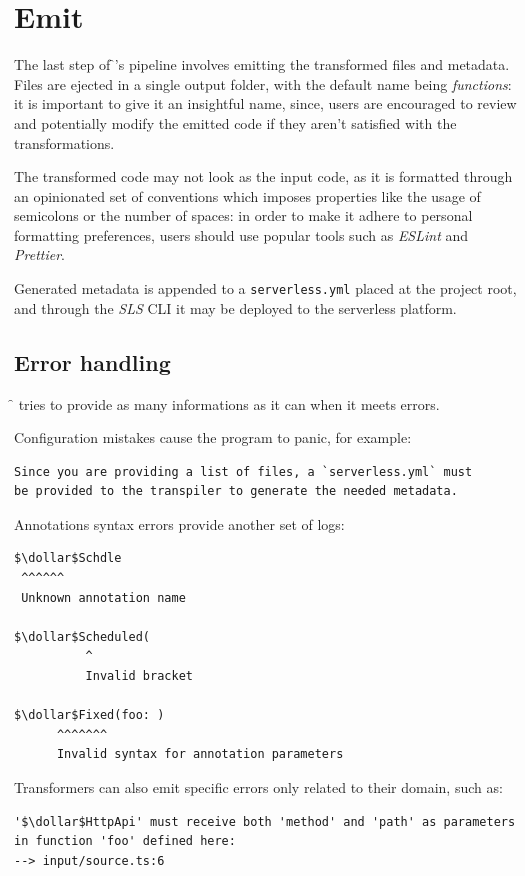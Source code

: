 \section{Emit}

The last step of \f{}'s pipeline involves emitting the transformed files and metadata.
Files are ejected in a single output folder,
with the default name being \textit{functions}: it is important to give it an insightful name,
since, users are encouraged to review and potentially modify the emitted code
if they aren't satisfied with the transformations.

The transformed code may not look as the input code, as it is formatted
through an opinionated set of conventions which imposes properties like
the usage of semicolons or the number of spaces:
in order to make it adhere to personal formatting preferences,
users should use popular tools such as \textit{ESLint} and \textit{Prettier}.

Generated metadata is appended to a \verb|serverless.yml| placed at the project root,
and through the \textit{SLS} CLI it may be deployed to the serverless platform.

\subsection{Error handling}

\f{} tries to provide as many informations as it can when it meets errors.

Configuration mistakes cause the program to panic, for example:
\begin{lstlisting}[language=console]
Since you are providing a list of files, a `serverless.yml` must
be provided to the transpiler to generate the needed metadata.
\end{lstlisting}

Annotations syntax errors provide another set of logs:
\begin{lstlisting}[language=console]
$\dollar$Schdle
 ^^^^^^
 Unknown annotation name

$\dollar$Scheduled(
          ^
          Invalid bracket

$\dollar$Fixed(foo: )
      ^^^^^^^
      Invalid syntax for annotation parameters
\end{lstlisting}

Transformers can also emit specific errors only related to their domain, such as:
\begin{lstlisting}[language=console]
'$\dollar$HttpApi' must receive both 'method' and 'path' as parameters
in function 'foo' defined here:
--> input/source.ts:6
\end{lstlisting}
